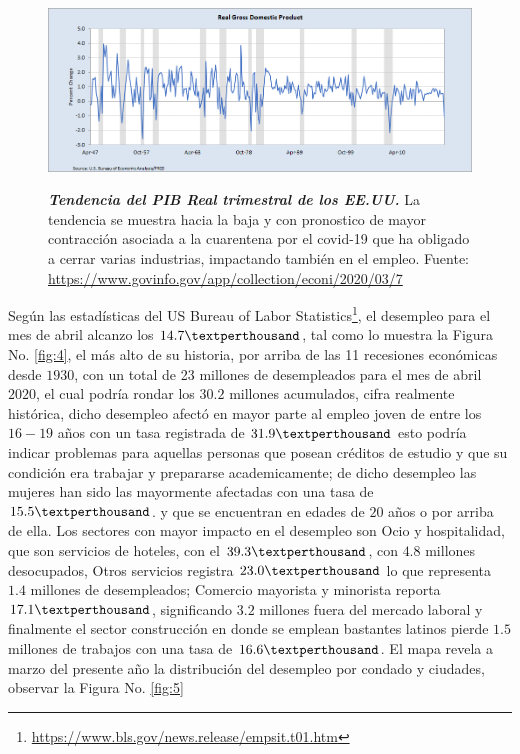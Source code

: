\begin{figure}[H]
	\centering
	\resizebox{16.5cm}{!} { 
	\includegraphics[width=1\linewidth]{Imagenes/PIB_USA}}
	\caption{\textbf{\textit{Tendencia del PIB Real trimestral de los EE.UU.}} {\small La tendencia se muestra hacia la baja y con pronostico de mayor contracción asociada a la cuarentena por el covid-19 que ha obligado a cerrar varias industrias, impactando también en el empleo. Fuente:  \href{https://www.govinfo.gov/app/collection/econi/2020/03/7}{https://www.govinfo.gov/app/collection/econi/2020/03/7}}
	} 
	\label{fig:3}
	
\end{figure}

Según las estadísticas del US Bureau of Labor Statistics\footnote{\href{https://www.bls.gov/news.release/empsit.t01.htm}{https://www.bls.gov/news.release/empsit.t01.htm}}, el desempleo para el mes de abril alcanzo los
$14.7 \textperthousand$, tal como lo muestra la Figura No. \eqref{fig:4}, el más alto de su historia, por arriba de las 11 recesiones económicas desde $1930$, con un total de 23 millones de desempleados para el mes de abril $2020$, el cual podría rondar los $30.2 $ millones acumulados, cifra realmente histórica, dicho desempleo afectó en mayor parte al empleo joven de entre los $ 16 - 19 $ años con un tasa registrada de $31.9 \textperthousand$ esto podría indicar problemas para aquellas personas que posean créditos de estudio y que su condición era trabajar y prepararse academicamente; de dicho desempleo las mujeres han sido las mayormente afectadas con una tasa de $15.5 \textperthousand$. y que se encuentran en edades de $20$ años o por arriba de ella. Los sectores con mayor impacto en el desempleo son Ocio y hospitalidad, que son servicios de hoteles, con el $39.3 \textperthousand$, con $4.8$ millones desocupados, Otros servicios registra $23.0 \textperthousand$ lo que representa $1.4$ millones de desempleados; Comercio mayorista y minorista reporta  $17.1 \textperthousand$, significando $3.2$ millones fuera del mercado laboral y finalmente el sector construcción en donde se emplean bastantes latinos pierde $1.5$ millones de trabajos con una tasa de $16.6 \textperthousand$. El mapa revela a marzo del presente año la distribución del desempleo por condado y ciudades, observar la Figura No. \eqref{fig:5} 


